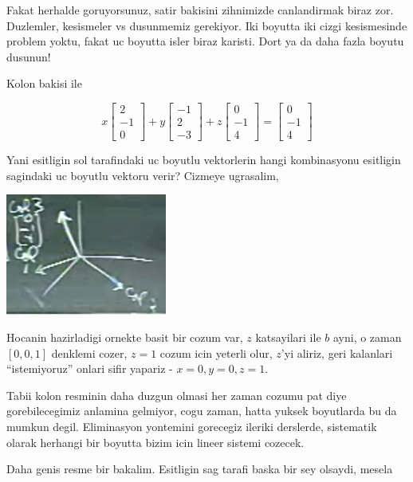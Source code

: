 \documentclass[12pt,fleqn]{article}\usepackage{../common}
\begin{document}
Fakat herhalde goruyorsunuz, satir bakisini zihnimizde canlandirmak biraz
zor. Duzlemler, kesismeler vs dusunmemiz gerekiyor. Iki boyutta iki cizgi
kesismesinde problem yoktu, fakat uc boyutta isler biraz karisti. Dort ya
da daha fazla boyutu dusunun! 

Kolon bakisi ile

$$ 
x 
\left[\begin{array}{r}
2 \\
-1 \\
0
\end{array}\right]
+
y
\left[\begin{array}{r}
-1 \\
2 \\
-3
\end{array}\right]
+
z 
\left[\begin{array}{r}
0 \\
-1 \\
4
\end{array}\right]
=
\left[\begin{array}{r}
0 \\
-1 \\
4
\end{array}\right]
 $$

Yani esitligin sol tarafindaki uc boyutlu vektorlerin hangi kombinasyonu
esitligin sagindaki uc boyutlu vektoru verir? Cizmeye ugrasalim,

\includegraphics[height=4cm]{1_08.png}

Hocanin hazirladigi ornekte basit bir cozum var, $z$ katsayilari ile $b$
ayni, o zaman $[0,0,1]$ denklemi cozer, $z=1$ cozum icin yeterli olur,
$z$'yi aliriz, geri kalanlari ``istemiyoruz'' onlari sifir yapariz -
$x=0,y=0,z=1$.

Tabii kolon resminin daha duzgun olmasi her zaman cozumu pat diye
gorebilecegimiz anlamina gelmiyor, cogu zaman, hatta yuksek boyutlarda bu
da mumkun degil. Eliminasyon yontemini gorecegiz ileriki derslerde,
sistematik olarak herhangi bir boyutta bizim icin lineer sistemi cozecek. 

Daha genis resme bir bakalim. Esitligin sag tarafi baska bir sey olsaydi,
mesela
\end{document}
